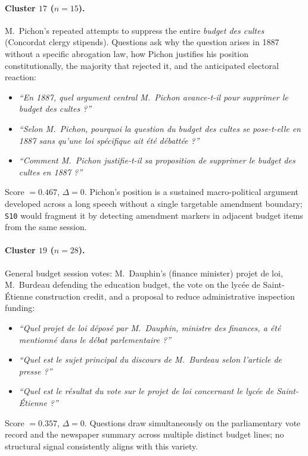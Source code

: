 \paragraph{Cluster $17$ ($n=15$).}
M.~Pichon's repeated attempts to suppress the entire \emph{budget des cultes}
(Concordat clergy stipends).
Questions ask why the question arises in 1887 without a specific abrogation law,
how Pichon justifies his position constitutionally, the majority that rejected
it, and the anticipated electoral reaction:
\begin{itemize}
  \item \textit{``En 1887, quel argument central M.~Pichon avance-t-il pour
    supprimer le budget des cultes ?''}
  \item \textit{``Selon M.~Pichon, pourquoi la question du budget des cultes se
    pose-t-elle en 1887 sans qu'une loi sp\'{e}cifique ait \'{e}t\'{e}
    d\'{e}batt\'{e}e ?''}
  \item \textit{``Comment M.~Pichon justifie-t-il sa proposition de supprimer le
    budget des cultes en 1887 ?''}
\end{itemize}
Score $= 0.467$, $\Delta = 0$.
Pichon's position is a sustained macro-political argument developed across a long
speech without a single targetable amendment boundary; \texttt{S10} would
fragment it by detecting amendment markers in adjacent budget items from the
same session.

\paragraph{Cluster $19$ ($n=28$).}
General budget session votes: M.~Dauphin's (finance minister) projet de loi,
M.~Burdeau defending the education budget, the vote on the lyc\'{e}e de
Saint-\'{E}tienne construction credit, and a proposal to reduce administrative
inspection funding:
\begin{itemize}
  \item \textit{``Quel projet de loi d\'{e}pos\'{e} par M.~Dauphin, ministre des
    finances, a \'{e}t\'{e} mentionn\'{e} dans le d\'{e}bat parlementaire ?''}
  \item \textit{``Quel est le sujet principal du discours de M.~Burdeau selon
    l'article de presse ?''}
  \item \textit{``Quel est le r\'{e}sultat du vote sur le projet de loi concernant
    le lyc\'{e}e de Saint-\'{E}tienne ?''}
\end{itemize}
Score $= 0.357$, $\Delta = 0$.
Questions draw simultaneously on the parliamentary vote record and the newspaper
summary across multiple distinct budget lines; no structural signal consistently
aligns with this variety.

